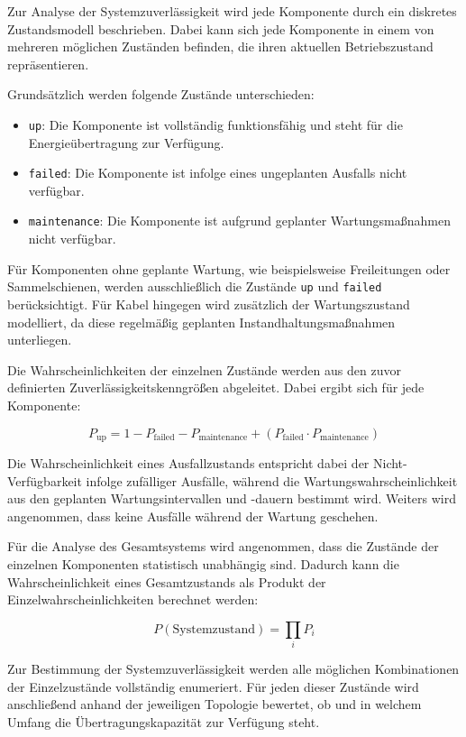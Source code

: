 \documentclass[a4paper,12pt]{article}
\begin{document}
Zur Analyse der Systemzuverlässigkeit wird jede Komponente durch ein diskretes
Zustandsmodell beschrieben. Dabei kann sich jede Komponente in einem von
mehreren möglichen Zuständen befinden, die ihren aktuellen Betriebszustand
repräsentieren.

Grundsätzlich werden folgende Zustände unterschieden:
\begin{itemize}
    \item \texttt{up}: Die Komponente ist vollständig funktionsfähig und steht
        für die Energieübertragung zur Verfügung.
    \item \texttt{failed}: Die Komponente ist infolge eines ungeplanten
        Ausfalls nicht verfügbar.
    \item \texttt{maintenance}: Die Komponente ist aufgrund geplanter
        Wartungsmaßnahmen nicht verfügbar.
\end{itemize}

Für Komponenten ohne geplante Wartung, wie beispielsweise Freileitungen oder
Sammelschienen, werden ausschließlich die Zustände \texttt{up} und
\texttt{failed} berücksichtigt. Für Kabel hingegen wird zusätzlich der
Wartungszustand modelliert, da diese regelmäßig geplanten
Instandhaltungsmaßnahmen unterliegen.

Die Wahrscheinlichkeiten der einzelnen Zustände werden aus den zuvor
definierten Zuverlässigkeitskenngrößen abgeleitet. Dabei ergibt sich für jede
Komponente:

\begin{equation}
    P_\text{up} = 1 - P_\text{failed} - P_\text{maintenance} + (P_\text{failed}
    \cdot P_\text{maintenance})
\end{equation}

Die Wahrscheinlichkeit eines Ausfallzustands entspricht dabei der
Nicht-Verfügbarkeit infolge zufälliger Ausfälle, während die
Wartungswahrscheinlichkeit aus den geplanten Wartungsintervallen und -dauern
bestimmt wird. Weiters wird angenommen, dass keine Ausfälle während der Wartung
geschehen.

Für die Analyse des Gesamtsystems wird angenommen, dass die Zustände der
einzelnen Komponenten statistisch unabhängig sind. Dadurch kann die
Wahrscheinlichkeit eines Gesamtzustands als Produkt der
Einzelwahrscheinlichkeiten berechnet werden:

\begin{equation}
P(\text{Systemzustand}) = \prod_i P_i
\end{equation}

Zur Bestimmung der Systemzuverlässigkeit werden alle möglichen Kombinationen
der Einzelzustände vollständig enumeriert. Für jeden dieser Zustände wird
anschließend anhand der jeweiligen Topologie bewertet, ob und in welchem Umfang
die Übertragungskapazität zur Verfügung steht.
\end{document}
